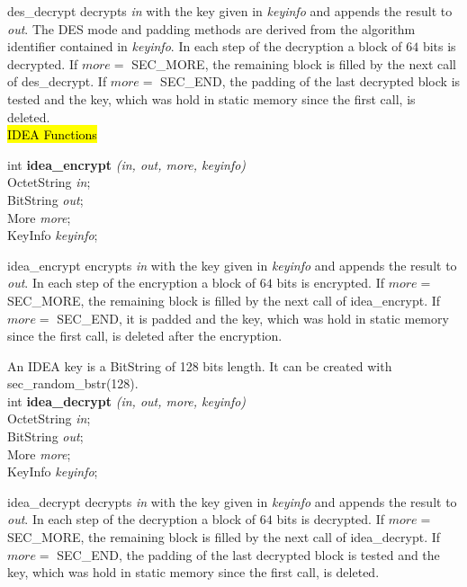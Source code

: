 des\_decrypt decrypts {\em in} with the key given in {\em keyinfo} and appends the result
to {\em out}. The DES mode and padding methods are derived from the algorithm identifier
contained in {\em keyinfo}.
In each step of the decryption a block of
$64$ bits is decrypted. If $more =$ SEC\_MORE,
the remaining block is filled by the next call of  des\_decrypt.
If $more =$ SEC\_END, the padding of the last decrypted block is tested and the key, which was hold in static memory since
the first call, is deleted.
\\ [1ex]




\hl{IDEA Functions}



int {\bf idea\_encrypt} {\em (in, out, more, keyinfo)} \\
OctetString {\em *in}; \\
BitString {\em *out}; \\
More {\em more}; \\
KeyInfo {\em *keyinfo}; 

idea\_encrypt encrypts {\em in} with the key given in {\em keyinfo} and appends the result
to {\em out}. 
In each step of the encryption a block of
$64$ bits is encrypted. If $more =$ SEC\_MORE,
the remaining block is filled by the next call of  idea\_encrypt.
If $more =$ SEC\_END, it is padded and the key, which was hold in static memory since
the first call, is deleted after the encryption.

An IDEA key is a BitString of 128 bits length.
It can be created with sec\_random\_bstr(128).
\\ [1ex]


int {\bf idea\_decrypt} {\em (in, out, more, keyinfo)} \\
OctetString {\em *in}; \\
BitString {\em *out}; \\
More {\em more}; \\
KeyInfo {\em *keyinfo}; 

idea\_decrypt decrypts {\em in} with the key given in {\em keyinfo} and appends the result
to {\em out}.
In each step of the decryption a block of
$64$ bits is decrypted. If $more =$ SEC\_MORE,
the remaining block is filled by the next call of  idea\_decrypt.
If $more =$ SEC\_END, the padding of the last decrypted block is tested and the key, which was hold in static memory since
the first call, is deleted.
\\ [1ex]



